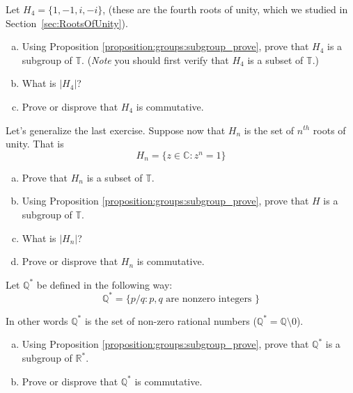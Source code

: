 \begin{exercise}{67}
Let  $H_4 = \{ 1, -1, i, -i \}$, (these are the  fourth roots of unity, which we studied in Section~\ref{sec:RootsOfUnity}).  
\begin{enumerate}[(a)]
\item
Using Proposition \ref{proposition:groups:subgroup_prove}, prove that $H_4$ is a subgroup of ${\mathbb T}$. (\emph{Note} you should first verify that $H_4$ is a subset of ${\mathbb T}$.)
\item  
What is $| H_4 |$?
\item
Prove or disprove that $H_4$ is commutative.
\end{enumerate}
\end{exercise}

\begin{exercise}{68}
Let's generalize the last exercise.  Suppose now that $H_n$ is the set of \emph{$n^{th}$} roots of unity.  That is 
\[
H_n = \{z \in {\mathbb C} : z^n = 1\} \]

\begin{enumerate}[(a)]
\item
Prove that $H_n$ is a subset of ${\mathbb T}$.
\item
Using Proposition \ref{proposition:groups:subgroup_prove}, prove that $H$ is a subgroup of ${\mathbb T}$.
\item  
What is $| H_n |$?
\item
Prove or disprove that $H_n$ is commutative.
\end{enumerate}
\end{exercise}

\begin{exercise}{69}
Let ${\mathbb Q}^*\label{noteQstar}$ be defined in the following way:
\[
{\mathbb Q}^* = \{ p/q : p, q \mbox{ are nonzero integers } \}
\]

In other words ${\mathbb Q}^*$ is the set of non-zero rational numbers (${\mathbb Q}^* = {\mathbb Q} \setminus 0$).

\begin{enumerate}[(a)]
\item
Using Proposition \ref{proposition:groups:subgroup_prove}, prove that ${\mathbb Q}^*$ is a subgroup of ${\mathbb R}^*$.
\item
Prove or disprove that ${\mathbb Q}^*$ is commutative.
\end{enumerate}
\end{exercise}

